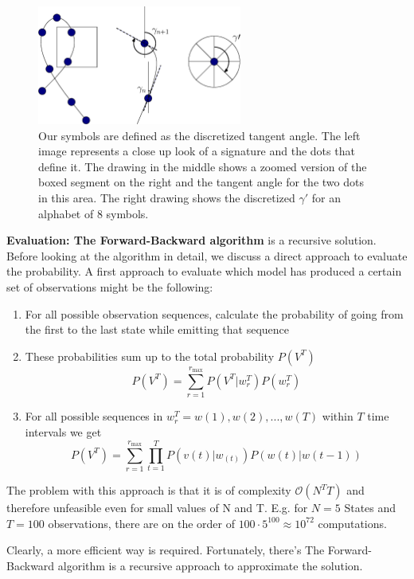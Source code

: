 \documentclass[a4paper, oneside]{csthesis}
\begin{document}
\begin{figure}[tb]
    \begin{center}
        \includegraphics[width=0.6\textwidth]{figures/symbol-creation.eps}
    \end{center}
    \caption{Our symbols are defined as the discretized tangent angle. The left image represents a close up look of a signature and the dots that define it. The drawing in the middle shows a zoomed version of the boxed segment on the right and the tangent angle for the two dots in this area. The right drawing shows the discretized $\gamma\prime$ for an alphabet of 8 symbols.}
    \label{fig:hmm-symbol-creation}
\end{figure}


\textbf{Evaluation: The Forward-Backward algorithm} is a recursive solution. Before looking at the algorithm in detail, we discuss a direct approach to evaluate the probability. A first approach to evaluate which model has produced a certain set of observations might be the following:
\begin{enumerate}
\item For all possible observation sequences, calculate the probability of going from the first to the last state while emitting that sequence
\item These probabilities sum up to the total probability $P(V^T)$
$$P(V^T) = \sum\limits_{r=1}^{r_\text{max}} P(V^T | w_r^T)P(w_r^T)$$
\item For all possible sequences in $w_r^T = w(1), w(2), ..., w(T)$ within $T$ time intervals we get
$$P(V^T) = \sum\limits_{r=1}^{r_\text{max}} \prod\limits_{t=1}^T  P(v(t) | w_(t)) P(w(t)|w(t-1))$$
\end{enumerate}
The problem with this approach is that it is of complexity $\mathcal{O}(N^TT)$ and therefore unfeasible even for small values of N and T. E.g. for $N=5$ States and $T=100$ observations, there are on the order of $100 \cdot 5^100 \approx 10^{72}$ computations.

Clearly, a more efficient way is required. Fortunately, there's The Forward-Backward algorithm is a recursive approach to approximate the solution.
\end{document}
